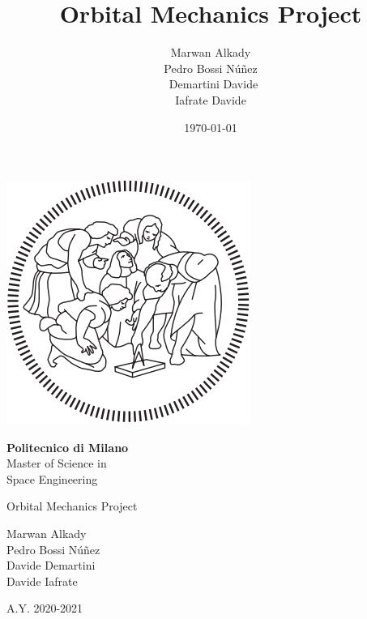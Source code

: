 \documentclass[11pt,a4paper]{report}
\title{Orbital Mechanics Project}
\author{Marwan Alkady\\ Pedro Bossi N\'{u}\~{n}ez \\\ Demartini Davide\\ Iafrate Davide\\}
\date{\today}
\begin{document}
\begin{titlepage}
	\clearpage\thispagestyle{empty}
	\centering


   \centering \includegraphics[scale=0.7]{logo}

   \vspace{0.5cm}

	{\Huge\textbf{Politecnico di Milano} \\
Master of Science in\\ Space Engineering \\
		 \par}
		\vspace{3cm}
	{\Huge{Orbital Mechanics Project}} \\
	\vspace{4cm}
	{\LARGE Marwan Alkady\\ Pedro Bossi N\'{u}\~{n}ez \\ Davide Demartini\\ Davide Iafrate\\ \par}

\vspace{1cm}
	{\Large A.Y. 2020-2021 \par}

	\pagebreak

\end{titlepage}
\maketitle
%
\tableofcontents
%
\end{document}
